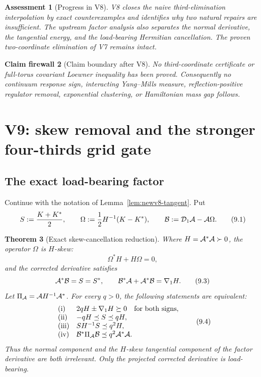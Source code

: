 \documentclass[11pt,oneside]{article}
\newtheorem{theorem}{Theorem}[section]
\newtheorem{assessment}[theorem]{Assessment}
\newtheorem{firewall}[theorem]{Claim firewall}
\theoremstyle{definition}
\theoremstyle{remark}
\begin{document}
\begin{assessment}[Progress in V8]
\label{ass:newv8-progress}
V8 closes the naive third-elimination interpolation by exact
counterexamples and identifies why two natural repairs are
insufficient.  The upstream factor analysis also separates the
normal derivative, the tangential energy, and the load-bearing
Hermitian cancellation.  The proven two-coordinate elimination of
V7 remains intact.
\end{assessment}

\begin{firewall}[Claim boundary after V8]
\label{fire:newv8-final}
No third-coordinate certificate or full-torus covariant Loewner
inequality has been proved.  Consequently no continuum response
sign, interacting Yang--Mills measure, reflection-positive regulator
removal, exponential clustering, or Hamiltonian mass gap follows.
\end{firewall}

\section{V9: skew removal and the stronger four-thirds grid gate}
\label{sec:newv9-skew}

\subsection{The exact load-bearing factor}

Continue with the notation of Lemma~\ref{lem:newv8-tangent}.  Put
\[
 S:=\frac{K+K^*}{2},\qquad
 \Omega:=\frac12H^{-1}(K-K^*),\qquad
 {\cal B}:={\cal D}_1{\cal A}-{\cal A}\Omega.             \tag{9.1}
\]

\begin{theorem}[Exact skew-cancellation reduction]
\label{thm:newv9-skew}
Where \(H={\cal A}^*{\cal A}\succ0\), the operator \(\Omega\) is
\(H\)-skew:
\[
 \Omega^*H+H\Omega=0,                                    \tag{9.2}
\]
and the corrected derivative satisfies
\[
 {\cal A}^*{\cal B}=S=S^*,\qquad
 {\cal B}^*{\cal A}+{\cal A}^*{\cal B}=\nabla_1H.         \tag{9.3}
\]
Let \(\Pi_{\cal A}={\cal A}H^{-1}{\cal A}^*\).  For every \(q>0\),
the following statements are equivalent:
\[
\begin{array}{ll}
\textup{(i)}&2qH\pm\nabla_1H\succeq0\quad\text{for both signs},\\
\textup{(ii)}&-qH\preceq S\preceq qH,\\
\textup{(iii)}&S H^{-1}S\preceq q^2H,\\
\textup{(iv)}&
{\cal B}^*\Pi_{\cal A}{\cal B}\preceq q^2{\cal A}^*{\cal A}.
\end{array}                                               \tag{9.4}
\]
Thus the normal component and the \(H\)-skew tangential component of
the factor derivative are both irrelevant.  Only the projected
corrected derivative is load-bearing.
\end{theorem}
\end{document}
